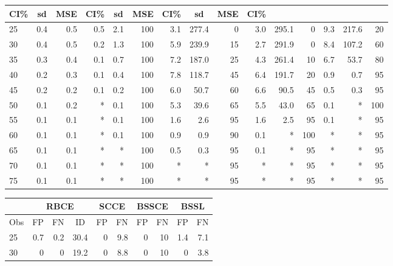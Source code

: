 \documentclass[preprint,12pt]{elsarticle}
\begin{document}
\begin{table}[ht]
\begin{tabular}{l|rrrrr|rrr|rrr|rrr}
		\multicolumn{1}{c|}{CI\%}&
		\multicolumn{1}{c}{sd}&
		\multicolumn{1}{c}{MSE}&
		\multicolumn{1}{c|}{CI\%}&
		\multicolumn{1}{c}{sd}&
		\multicolumn{1}{c}{MSE}&
		\multicolumn{1}{c|}{CI\%}&
		\multicolumn{1}{c}{sd}&
		\multicolumn{1}{c}{MSE}&
		\multicolumn{1}{c}{CI\%}
		\\
		\hline
		25 & 0.4 & 0.5 & 0.5 & 2.1 & 100 & 3.1 & 277.4 & 0 & 3.0 & 295.1 & 0 & 9.3 & 217.6 & 20 \\ 
		30 & 0.4 & 0.5 & 0.2 & 1.3 & 100 & 5.9 & 239.9 & 15 & 2.7 & 291.9 & 0 & 8.4 & 107.2 & 60 \\ 
		35 & 0.3 & 0.4 & 0.1 & 0.7 & 100 & 7.2 & 187.0 & 25 & 4.3 & 261.4 & 10 & 6.7 & 53.7 & 80 \\ 
		40 & 0.2 & 0.3 & 0.1 & 0.4 & 100 & 7.8 & 118.7 & 45 & 6.4 & 191.7 & 20 & 0.9 & 0.7 & 95 \\ 
		45 & 0.2 & 0.2 & 0.1 & 0.2 & 100 & 6.0 & 50.7 & 60 & 6.6 & 90.5 & 45 & 0.5 & 0.3 & 95 \\ 
		50 & 0.1 & 0.2 & * & 0.1 & 100 & 5.3 & 39.6 & 65 & 5.5 & 43.0 & 65 & 0.1 & * & 100 \\ 
		55 & 0.1 & 0.1 & * & 0.1 & 100 & 1.6 & 2.6 & 95 & 1.6 & 2.5 & 95 & 0.1 & * & 95 \\ 
		60 & 0.1 & 0.1 & * & 0.1 & 100 & 0.9 & 0.9 & 90 & 0.1 & * & 100 & * & * & 95 \\ 
		65 & 0.1 & 0.1 & * & * & 100 & 0.5 & 0.3 & 95 & 0.1 & * & 95 & * & * & 95 \\ 
		70 & 0.1 & 0.1 & * & * & 100 & * & * & 95 & * & * & 95 & * & * & 95 \\ 
		75 & 0.1 & 0.1 & * & * & 100 & * & * & 95 & * & * & 95 & * & * & 95 \\ 
		\hline
	\end{tabular}
	\begin{tabular}{l|rrr|rr|rr|rr}
		\hline
		\multicolumn{1}{l|}{}&
		\multicolumn{3}{c|}{RBCE}&
		\multicolumn{2}{c|}{SCCE}&
		\multicolumn{2}{c|}{BSSCE}&
		\multicolumn{2}{c}{BSSL}\\
		\hline
		\multicolumn{1}{l|}{Obs}&
		\multicolumn{1}{c}{FP}&
		\multicolumn{1}{c}{FN}&
		\multicolumn{1}{c|}{ID}&
		\multicolumn{1}{c}{FP}&
		\multicolumn{1}{c|}{FN}&
		\multicolumn{1}{c}{FP}&
		\multicolumn{1}{c|}{FN}&
		\multicolumn{1}{c}{FP}&
		\multicolumn{1}{c}{FN}
		\\
		\hline
		25 & 0.7 & 0.2 & 30.4 & 0 & 9.8 & 0 & 10 & 1.4 & 7.1 \\ 
		30 & 0 & 0 & 19.2 & 0 & 8.8 & 0 & 10 & 0 & 3.8 \\ 

\end{tabular}
\end{table}
\end{document}
